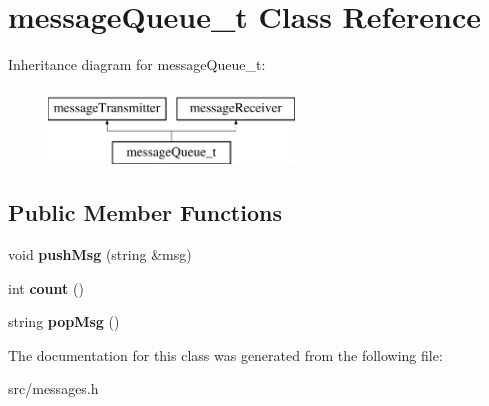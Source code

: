 \hypertarget{classmessageQueue__t}{\section{message\-Queue\-\_\-t \-Class \-Reference}
\label{classmessageQueue__t}
}
\-Inheritance diagram for message\-Queue\-\_\-t\-:\begin{figure}[H]
\begin{center}
\leavevmode
\includegraphics[height=2.000000cm]{classmessageQueue__t}
\end{center}
\end{figure}
\subsection*{\-Public \-Member \-Functions}
\begin{DoxyCompactItemize}
\item 
\hypertarget{classmessageQueue__t_a7de3ad392e28ae15ed4f64992ba30f74}{void {\bfseries push\-Msg} (string \&msg)}\label{classmessageQueue__t_a7de3ad392e28ae15ed4f64992ba30f74}

\item 
\hypertarget{classmessageQueue__t_af1d28cbee5584d27c1681a976ce6bcc2}{int {\bfseries count} ()}\label{classmessageQueue__t_af1d28cbee5584d27c1681a976ce6bcc2}

\item 
\hypertarget{classmessageQueue__t_abcd807dc893882e9940d4d11e74d39d7}{string {\bfseries pop\-Msg} ()}\label{classmessageQueue__t_abcd807dc893882e9940d4d11e74d39d7}

\end{DoxyCompactItemize}


\-The documentation for this class was generated from the following file\-:\begin{DoxyCompactItemize}
\item 
src/messages.\-h\end{DoxyCompactItemize}
